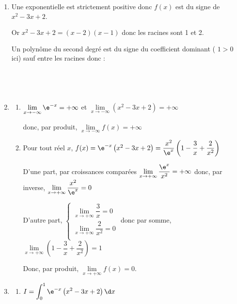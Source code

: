 	\begin{enumerate}
		\item  Une exponentielle est strictement positive donc  $f(x)$ est du signe  de $x^2-3x+2$.

		Or $x^2-3x+2 = (x-2)(x-1)$ donc les racines sont 1 et 2.

		Un polynôme du second degré est du signe du coefficient dominant ( $1>0$ ici) sauf entre les racines donc :

		\hfill~
		\hfill~




		\item \begin{enumerate}
			\item  $\lim\limits_{x \to - \infty} \e^{-x}= +\infty$ et $\lim\limits_{x \to -\infty} \left(x^{2}-3 x+2\right) = + \infty$

			donc, par produit, $\lim\limits_{x \to - \infty} f(x)= +\infty$


			\item  Pour tout réel $x$, $f(x) = \e^{-x}\left(x^{2}-3 x+2\right) = \dfrac{x^2}{\e^x} \left(1 - \dfrac{3}{x} +\dfrac{2}{x^2} \right)$

			D'une part, par croissances comparées $ \lim\limits_{x \to + \infty} \dfrac{\e^{x}}{x^2} = +\infty$  donc,  par inverse, $ \lim\limits_{x \to + \infty} \dfrac{x^2}{\e^{x}} = 0$


			D'autre part, $\begin{cases}
				\lim\limits_{x \to +\infty } \dfrac{3}{x} =0\\
				\lim\limits_{x \to +\infty } \dfrac{2}{x^2} =0\\
			\end{cases}$ donc par somme, $ \lim\limits_{x \to + \infty}\left(1 - \dfrac{3}{x} +\dfrac{2}{x^2} \right) =1$

			Donc, par produit, $\lim\limits_{x \to + \infty} f(x) =0$.


		\end{enumerate}

		\item

		\begin{enumerate}
			\item  $\displaystyle I=\int_{0}^{1} \e^{-x}\left(x^{2}-3 x+2\right)  \d x  $


\end{enumerate}
\end{enumerate}
